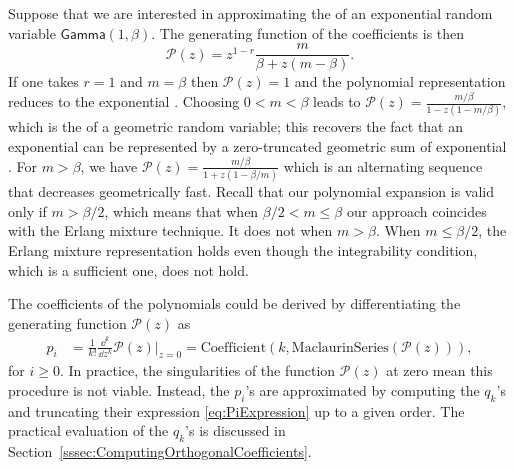 \begin{example}\label{ex:RecoveryExponentialRV}
Suppose that we are interested in approximating the \pdf of an exponential random variable $\mathsf{Gamma}(1,\beta)$. The generating function of the coefficients is then
\begin{equation*}\label{eq:GeneratingFunctionExpRV}
\mathcal{P}(z)=z^{1-r}\frac{m}{\beta+z(m-\beta)}.
\end{equation*}
If one takes $r=1$ and $m=\beta$ then $\mathcal{P}(z)=1$ and the polynomial representation reduces to the exponential \pdf. Choosing $0<m<\beta$ leads to $\mathcal{P}(z)=\frac{m/\beta}{1-z(1-m/\beta)}$, which is the \pgf of a geometric random variable; this recovers the fact that an exponential \rv can be represented by a zero-truncated geometric sum of exponential \rvs. For $m>\beta$, we have $\mathcal{P}(z)=\frac{m/\beta}{1+z(1-\beta/m)}$ which is an alternating sequence that decreases geometrically fast. Recall that our polynomial expansion is valid only if $m>\beta/2$, which means that when $\beta/2<m\leq \beta$ our approach coincides with the Erlang mixture technique. It does not when $m>\beta$. When $m\leq\beta/2$, the Erlang mixture representation holds even though the integrability condition, which is a sufficient one, does not hold.
\end{example}
The coefficients of the polynomials could be derived by differentiating the generating function $\mathcal{P}(z)$ as
\begin{align*}\label{eq:PolynomialExpansionCoefficientDerivativeGeneratingFunction}
p_i&=\frac{1}{k!}\frac{\dd^{k}}{\dd z^{k}}\mathcal{P}(z)\Big\rvert_{z=0}  =\text{Coefficient}(k, \text{MaclaurinSeries}(\mathcal{P}(z))),
\end{align*}
for $i\geq0$. In practice, the singularities of the function $\mathcal{P}(z)$ at zero mean this procedure is not viable. Instead, the $p_i$'s are approximated by computing the $q_k$'s and truncating their expression \eqref{eq:PiExpression} up to a given order. The practical evaluation of the $q_k$'s is discussed in Section~\ref{sssec:ComputingOrthogonalCoefficients}.

